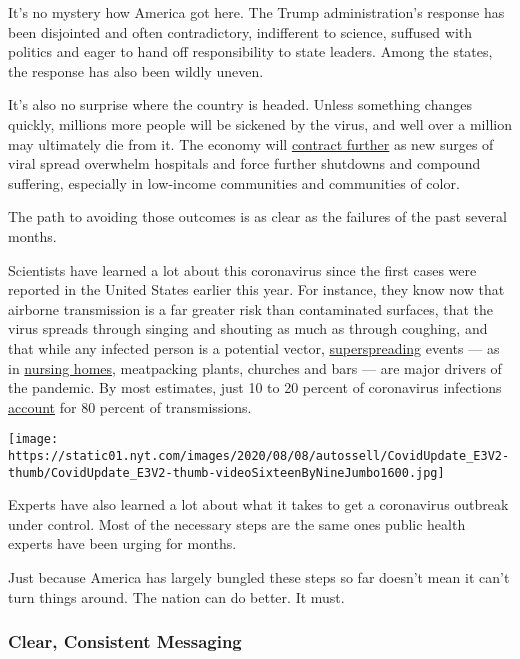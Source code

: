 It's no mystery how America got here. The Trump administration's
response has been disjointed and often contradictory, indifferent to
science, suffused with politics and eager to hand off responsibility to
state leaders. Among the states, the response has also been wildly
uneven.

It's also no surprise where the country is headed. Unless something
changes quickly, millions more people will be sickened by the virus, and
well over a million may ultimately die from it. The economy will
\href{https://www.nytimes.com/2020/07/30/business/economy/q2-gdp-coronavirus-economy.html}{contract
further} as new surges of viral spread overwhelm hospitals and force
further shutdowns and compound suffering, especially in low-income
communities and communities of color.

The path to avoiding those outcomes is as clear as the failures of the
past several months.

Scientists have learned a lot about this coronavirus since the first
cases were reported in the United States earlier this year. For
instance, they know now that airborne transmission is a far greater risk
than contaminated surfaces, that the virus spreads through singing and
shouting as much as through coughing, and that while any infected person
is a potential vector,
\href{https://www.nytimes.com/2020/06/30/science/how-coronavirus-spreads.html}{superspreading}
events --- as in
\href{https://www.nytimes.com/interactive/2020/us/coronavirus-nursing-homes.html}{nursing
homes}, meatpacking plants, churches and bars --- are major drivers of
the pandemic. By most estimates, just 10 to 20 percent of coronavirus
infections
\href{https://www.scientificamerican.com/article/how-superspreading-events-drive-most-covid-19-spread1/\#:~:text=In\%20fact\%2C\%20research\%20on\%20actual,percent\%20of\%20the\%20coronavirus's\%20spread.}{account}
for 80 percent of transmissions.

\texttt{[image: https://static01.nyt.com/images/2020/08/08/autossell/CovidUpdate\_E3V2-thumb/CovidUpdate\_E3V2-thumb-videoSixteenByNineJumbo1600.jpg]}

Experts have also learned a lot about what it takes to get a coronavirus
outbreak under control. Most of the necessary steps are the same ones
public health experts have been urging for months.

Just because America has largely bungled these steps so far doesn't mean
it can't turn things around. The nation can do better. It must.

\hypertarget{clear-consistent-messaging}{%
\subsubsection{Clear, Consistent
Messaging}\label{clear-consistent-messaging}}


